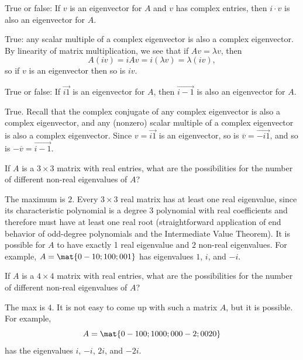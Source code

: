 \begin{problems}
\problem %
True or false: If $v$ is an eigenvector for $A$ and $v$ has complex entries,
then $i \cdot v$ is also an eigenvector for $A$.

\begin{solution}
  True: any scalar multiple of a complex eigenvector is also a complex
  eigenvector.  By linearity of matrix multiplication, we see that if
  $Av = \lambda v$, then
  \[A(iv) = i Av= i(\lambda v) = \lambda(iv),\]
  so if $v$ is an eigenvector then so is $iv$.
\end{solution}

\problem %
True or false: If $\vec{i 1}$ is an eigenvector for $A$, then $\vec{i -1}$ is
also an eigenvector for $A$. %

\begin{solution}
  True. Recall that the complex conjugate of any complex eigenvector is also a
  complex eigenvector, and any (nonzero) scalar multiple of a complex
  eigenvector is also a complex eigenvector.
  \newline \newline %
  Since $v = \vec{i 1}$ is an eigenvector, so is
  $\overline{v} = \vec{-i 1}$, and so is $-\overline{v} = \vec{i -1}$.
\end{solution}

\problem %
If $A$ is a $3 \times 3$ matrix with real entries, what are the possibilities
for the number of different non-real eigenvalues of $A$?

\begin{solution}
  The maximum is $2$.  Every $3 \times 3$ real matrix has at least one real
  eigenvalue, since its characteristic polynomial is a degree $3$ polynomial
  with real coefficients and therefore must have at least one real root
  (straightforward application of end behavior of odd-degree polynomials and the
  Intermediate Value Theorem).  \newline \newline %
  It is possible for $A$ to have exactly 1 real eigenvalue and $2$ non-real
  eigenvalues.  For example, $A = \mat{0 -1 0; 1 0 0; 0 0 1}$ has eigenvalues
  $1$, $i$, and $-i$.
\end{solution}

\problem %
If $A$ is a $4 \times 4$ matrix with real entries, what are the possibilities
for the number of different non-real eigenvalues of $A$?

\begin{solution}
  The max is $4$.  It is not easy to come up with such a matrix $A$, but it is
  possible.  For example,
  \[A = \mat{0 -1 0 0; 1 0 0 0; 0 0 0 -2; 0 0 2 0}\] has the eigenvalues $i$,
  $-i$, $2i$, and $-2i$.
\end{solution}


\end{problems}
